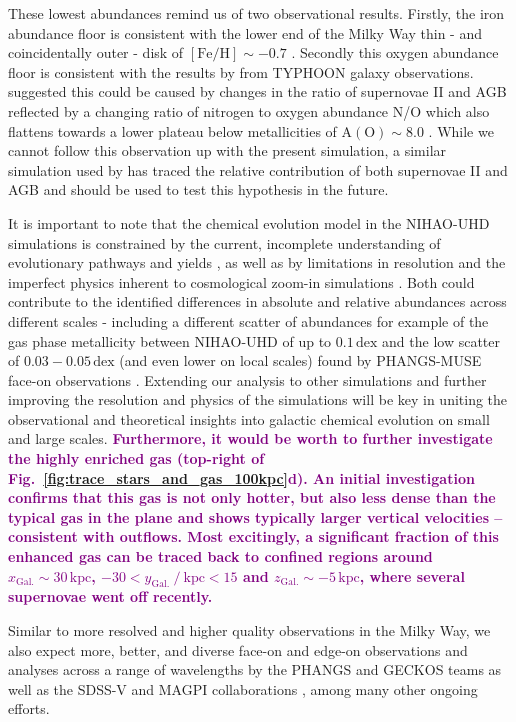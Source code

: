 \documentclass[twocolumn,apj,numberedappendix,appendixfloats,twocolappendix]{openjournal}
\newcommand{\adjusted}[1]{\textbf{\textcolor{purple}{#1}}}
\begin{document}
\begin{CJK*}{UTF8}{gbsn}
These lowest abundances remind us of two observational results. Firstly, the iron abundance floor is consistent with the lower end of the Milky Way thin - and coincidentally outer - disk of ${\mathrm{[Fe/H]} \sim -0.7}$ \citep{Bensby2014, Buder2019}. Secondly this oxygen abundance floor is consistent with the results by \citet{Grasha2022} from TYPHOON galaxy observations. \citet{Grasha2022} suggested this could be caused by changes in the ratio of supernovae II and AGB reflected by a changing ratio of nitrogen to oxygen abundance N/O which also flattens towards a lower plateau below metallicities of ${\mathrm{A(O)} \sim 8.0}$ \citep{Nicholls2017}. While we cannot follow this observation up with the present simulation, a similar simulation used by \citet{Buder2024} has traced the relative contribution of both supernovae II and AGB and should be used to test this hypothesis in the future.

It is important to note that the chemical evolution model in the NIHAO-UHD simulations is constrained by the current, incomplete understanding of evolutionary pathways and yields \citep{Buck2021}, as well as by limitations in resolution and the imperfect physics inherent to cosmological zoom-in simulations \citep{Buck2020}.
Both could contribute to the identified differences in absolute and relative abundances across different scales - including a different scatter of abundances for example of the gas phase metallicity between NIHAO-UHD of up to $0.1\,\mathrm{dex}$ and the low scatter of $0.03-0.05\,\mathrm{dex}$ (and even lower on local scales) found by PHANGS-MUSE face-on observations \citep{Kreckel2020}. Extending our analysis to other simulations and further improving the resolution and physics of the simulations will be key in uniting the observational and theoretical insights into galactic chemical evolution on small and large scales. \adjusted{Furthermore, it would be worth to further investigate the highly enriched gas (top-right of Fig.~\ref{fig:trace_stars_and_gas_100kpc}d). An initial investigation confirms that this gas is not only hotter, but also less dense than the typical gas in the plane and shows typically larger vertical velocities -- consistent with outflows. Most excitingly, a significant fraction of this enhanced gas can be traced back to confined regions around $x_\mathrm{Gal.}\sim30\,\mathrm{kpc}$, $-30 < y_\mathrm{Gal.}~/~\mathrm{kpc} < 15$ and $z_\mathrm{Gal.}\sim-5\,\mathrm{kpc}$, where several supernovae went off recently.}

Similar to more resolved and higher quality observations in the Milky Way, we also expect more, better, and diverse face-on and edge-on observations and analyses across a range of wavelengths by the PHANGS and GECKOS teams \citep{Kreckel2019, Kreckel2020, GECKOS2023} as well as the SDSS-V and MAGPI collaborations \citep{Kollmeier2017, MAGPI2021, Mun2024, Chen2024}, among many other ongoing efforts.


\end{CJK*}
\end{document}
